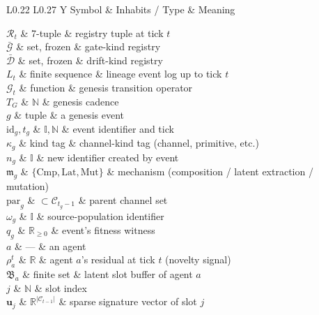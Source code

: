 \documentclass[journal,onecolumn,11pt]{IEEEtran}
\theoremstyle{definition}
\newcommand{\notationtable}[3]{%
  \begin{table}[ht]
  \centering
  \caption{#1}
  \label{#2}
  \small
  \renewcommand{\arraystretch}{1.1}
  \begin{tabularx}{\linewidth}{L{0.22\linewidth} L{0.27\linewidth} Y}
  \toprule
  Symbol & Inhabits / Type & Meaning \\
  \midrule
  #3
  \bottomrule
  \end{tabularx}
  \end{table}%
}
\begin{document}
\notationtable{Symbols introduced in \cref{sec:genesis} (excluding revision; see \cref{sec:revision}).}{tab:notation-genesis}{
$\mathcal{R}_t$           & 7-tuple                      & registry tuple at tick $t$ \\
$\bar{\mathcal{G}}$       & set, frozen                  & gate-kind registry \\
$\bar{\mathcal{D}}$       & set, frozen                  & drift-kind registry \\
$L_t$                     & finite sequence              & lineage event log up to tick $t$ \\
$\mathcal{G}_t$           & function                     & genesis transition operator \\
$T_G$                     & $\mathbb{N}$                 & genesis cadence \\
$g$                       & tuple                        & a genesis event \\
$\mathrm{id}_g, t_g$      & $\mathbb{I}, \mathbb{N}$     & event identifier and tick \\
$\kappa_g$                & kind tag                     & channel-kind tag (channel, primitive, etc.) \\
$n_g$                     & $\mathbb{I}$                 & new identifier created by event \\
$\mathfrak{m}_g$          & $\{\mathrm{Cmp},\mathrm{Lat},\mathrm{Mut}\}$ & mechanism (composition / latent extraction / mutation) \\
$\mathrm{par}_g$          & $\subset \mathcal{C}_{t_g - 1}$ & parent channel set \\
$\omega_g$                & $\mathbb{I}$                 & source-population identifier \\
$q_g$                     & $\mathbb{R}_{\ge 0}$         & event's fitness witness \\
$a$                       & ---                          & an agent \\
$\rho_a^t$                & $\mathbb{R}$                 & agent $a$'s residual at tick $t$ (novelty signal) \\
$\mathfrak{B}_a$          & finite set                   & latent slot buffer of agent $a$ \\
$j$                       & $\mathbb{N}$                 & slot index \\
$\mathbf{u}_j$            & $\mathbb{R}^{|\mathcal{C}_{t-1}|}$ & sparse signature vector of slot $j$ \\
}
\end{document}
